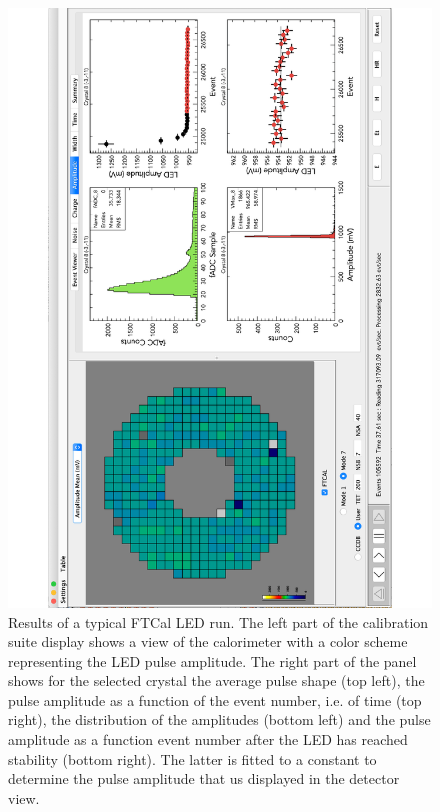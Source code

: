 \begin{figure}
\includegraphics[height=1.0\columnwidth,angle=270]{fig/ftcal_ledrun.pdf}
\caption{Results of a typical FTCal LED run. The left part of the calibration suite display shows a view of the calorimeter with a color scheme representing the LED pulse amplitude. The right part of the panel shows for the selected crystal the average pulse shape (top left), the pulse amplitude as a function of the event number, i.e. of time (top right), the distribution of the amplitudes (bottom left) and the pulse amplitude  as a function event number after the LED has reached stability (bottom right). The latter is fitted to a constant to determine the pulse amplitude that us displayed in the detector view.}
\label{fig:ftcal_ledrun}
\end{figure}

